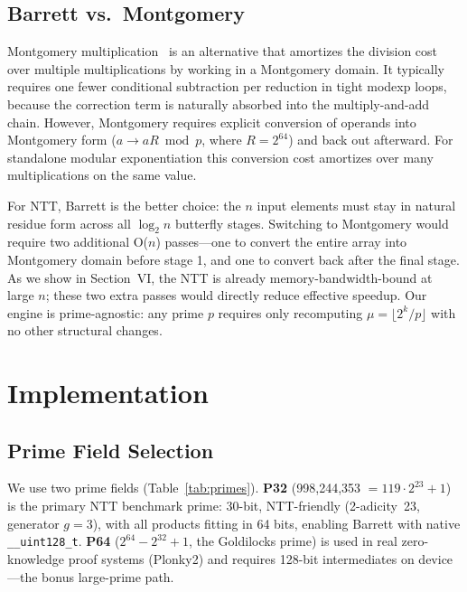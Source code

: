 \documentclass[conference]{IEEEtran}
\begin{document}
\subsection{Barrett vs.\ Montgomery}

Montgomery multiplication~\cite{montgomery} is an alternative that amortizes
the division cost over multiple multiplications by working in a Montgomery domain.
It typically requires one fewer conditional subtraction per reduction in tight
modexp loops, because the correction term is naturally absorbed into the
multiply-and-add chain. However, Montgomery requires explicit conversion of
operands into Montgomery form ($a \to aR \bmod p$, where $R = 2^{64}$) and
back out afterward. For standalone modular exponentiation this conversion cost
amortizes over many multiplications on the same value.

For NTT, Barrett is the better choice: the $n$ input elements must stay in
natural residue form across all $\log_2 n$ butterfly stages. Switching to
Montgomery would require two additional O($n$) passes---one to convert the
entire array into Montgomery domain before stage 1, and one to convert back
after the final stage. As we show in Section~VI, the NTT is already
memory-bandwidth-bound at large $n$; these two extra passes would directly reduce
effective speedup. Our engine is prime-agnostic: any prime $p$ requires only
recomputing $\mu = \lfloor 2^k / p \rfloor$ with no other structural changes.

\section{Implementation}

\subsection{Prime Field Selection}

We use two prime fields (Table~\ref{tab:primes}).
\textbf{P32} (998{,}244{,}353 $= 119 \cdot 2^{23} + 1$) is the primary NTT
benchmark prime: 30-bit, NTT-friendly (2-adicity~23, generator $g=3$), with
all products fitting in 64 bits, enabling Barrett with native
\texttt{\_\_uint128\_t}. \textbf{P64} ($2^{64} - 2^{32} + 1$, the Goldilocks
prime) is used in real zero-knowledge proof systems (Plonky2) and requires
128-bit intermediates on device---the bonus large-prime path.
\end{document}
